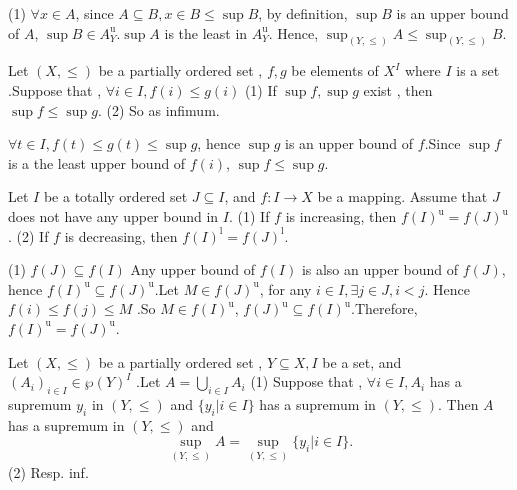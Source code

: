 \documentclass{book}
\numberwithin{equation}{section}
\begin{document}
\begin{proofenv}
    \quad
    \newline
    (1) $\forall x\in A$, since $A\subseteq B, x\in B \le \sup B$, by definition,  $\sup B$ is an upper bound of $A$, $\sup B\in A_Y^\mathrm{u}$.$\sup A$ is the least in $A_Y^\mathrm{u}$. Hence, $\sup_{(Y, \le)}A \le \sup_{(Y, \le)}B$.
\end{proofenv}
\begin{propositionenv}\label{proposition4.5.3}
    Let $(X, \le )$ be a partially ordered set , $f, g$ be elements of $X^I$ where $I$ is a set .Suppose that , $\forall i\in  I , f(i)\le g(i)$
 \newline
 (1) If $\sup f, \sup g$ exist , then $\sup f\le\sup g$.
 \newline
 (2) So as infimum.
\end{propositionenv}
\begin{proofenv}
    $\forall t\in I, f(t)\le g(t)\le \sup g$, hence $\sup g$ is an upper bound of $f$.Since $\sup f $ is a the least upper bound of $f(i)$, $\sup f\le\sup g$.
\end{proofenv}
\begin{propositionenv}
    Let $I$ be a totally ordered set $J\subseteq I $, and $f:I\rightarrow X $ be a mapping. Assume that $J$ does not have any upper bound in $I$.
    \newline 
    (1) If $f$ is increasing,  then $f(I)^\mathrm{u}=f(J)^\mathrm{u}$.
    \newline
    (2) If $f$ is decreasing,  then $f(I)^\mathrm{l}=f(J)^\mathrm{l}$.
\end{propositionenv}
\begin{proofenv}
    \quad 
    \newline
    (1) $f(J)\subseteq f(I)$ Any upper bound of $f(I)$ is also an upper bound of $f(J)$, hence $f(I)^\mathrm{u}\subseteq f(J)^\mathrm{u}$.Let $M\in f(J)^\mathrm{u}$, for any $i\in I, \exists j\in J, i<j$. Hence $f(i)\le f(j)\le M$ .So $M\in f(I)^\mathrm{u}$, $f(J)^\mathrm{u}\subseteq f(I)^\mathrm{u}$.Therefore, $f(I)^\mathrm{u}=f(J)^\mathrm{u}$.
\end{proofenv}
\begin{propositionenv}
    Let $(X, \le)$ be a partially ordered set , $Y\subseteq X, I$ be a set,  and $(A_i)_{i\in I}\in \wp (Y)^I$ .Let $A=\bigcup _{i\in I}A_i$
    \newline
    (1) Suppose that , $\forall i \in I, A_i$ has a supremum $y_i$ in $(Y, \le)$ and $\{y_i|i\in I\}$ has a supremum in $(Y, \le)$. Then $A$ has a supremum in $(Y, \le )$ and $$\sup_{(Y, \le)}A=\sup_{(Y, \le)}\{y_i|i\in I\}.$$
    \newline
    (2) Resp. inf.
\end{propositionenv}
\end{document}
